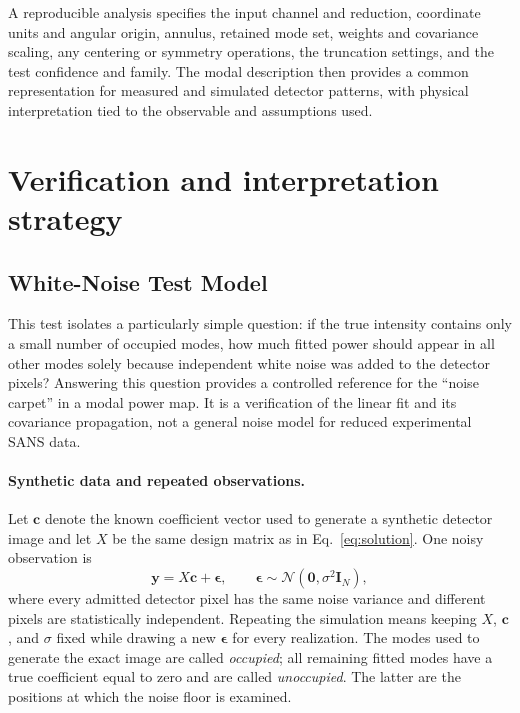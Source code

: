\documentclass[aps,prb,preprint,onecolumn,notitlepage,amsmath,amssymb,
  superscriptaddress,floatfix]{revtex4-2}
\begin{document}
A reproducible analysis specifies the input channel and reduction,
coordinate units and angular origin, annulus, retained mode set, weights
and covariance scaling, any centering or symmetry operations, the
truncation settings, and the test confidence and family.
The modal description then provides
a common representation for measured and simulated detector patterns,
with physical interpretation tied to the observable and assumptions used.

\section{Verification and interpretation strategy}
\label{sec:verification-strategy}

\subsection{White-Noise Test Model}

This test isolates a particularly simple question: if the true intensity
contains only a small number of occupied modes, how much fitted power should
appear in all other modes solely because independent white noise was added to
the detector pixels?  Answering this question provides a controlled reference
for the ``noise carpet'' in a modal power map.  It is a verification of the
linear fit and its covariance propagation, not a general noise model for
reduced experimental SANS data.

\paragraph{Synthetic data and repeated observations.}
Let $\bm c$ denote the known coefficient vector used to generate a synthetic
detector image and let $X$ be the same design matrix as in
Eq.~\eqref{eq:solution}.  One noisy observation is
\begin{equation}
 \bm y=X\bm c+\bm\epsilon,
 \qquad
 \bm\epsilon\sim\mathcal{N}(\bm 0,\sigma^2\mathbf{I}_N),
 \label{eq:white-noise-model}
\end{equation}
where every admitted detector pixel has the same noise variance and different
pixels are statistically independent.  Repeating the simulation means keeping
$X$, $\bm c$, and $\sigma$ fixed while drawing a new $\bm\epsilon$ for every
realization.  The modes used to generate the exact image are called
\emph{occupied}; all remaining fitted modes have a true coefficient equal to
zero and are called \emph{unoccupied}.  The latter are the positions at which
the noise floor is examined.
\end{document}
